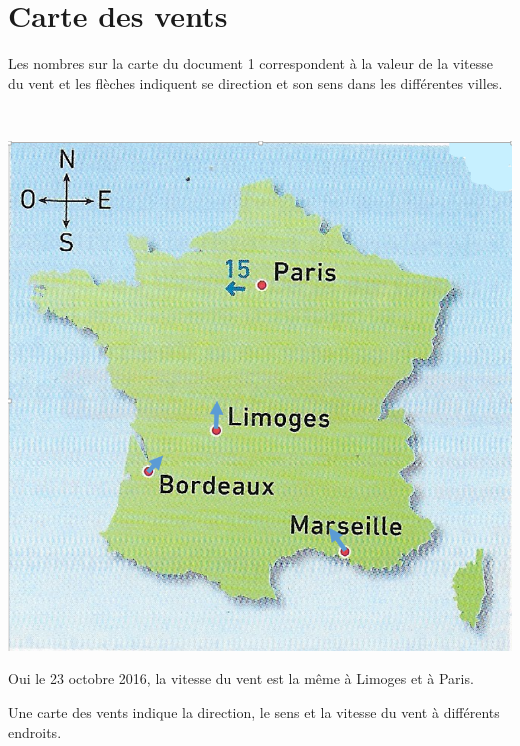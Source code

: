\section{Carte des vents}

\begin{questions}
	\question Les nombres sur la carte du document 1 correspondent à la valeur de la vitesse du vent et les flèches indiquent se direction et son sens dans les différentes villes.
	
	\question \ \\
		\begin{center}
			\includegraphics[scale=0.4]{carte2}
		\end{center}
		
	\question Oui le 23 octobre 2016, la vitesse du vent est la même à Limoges et à Paris.
	
	\question Une carte des vents indique la direction, le sens et la vitesse du vent à différents endroits.
\end{questions}